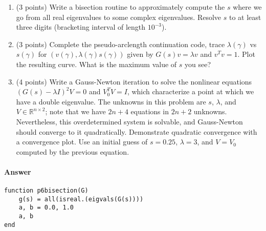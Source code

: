 \documentclass[12pt, leqno]{article} %
\providecommand{\tightlist}{%
  \setlength{\itemsep}{0pt}\setlength{\parskip}{0pt}}
\begin{document}
\begin{enumerate}
\def\labelenumi{\arabic{enumi}.}
\tightlist
\item
  (3 points) Write a bisection routine to approximately compute the
  \(s\) where we go from all real eigenvalues to some complex
  eigenvalues. Resolve \(s\) to at least three digits (bracketing
  interval of length \(10^{-3}\)).
\item
  (3 points) Complete the pseudo-arclength continuation code, trace
  \(\lambda(\gamma)\) vs \(s(\gamma)\) for
  \((v(\gamma), \lambda(\gamma) s(\gamma))\) given by
  \(G(s) v = \lambda v\) and \(v^T v = 1\). Plot the resulting curve.
  What is the maximum value of \(s\) you see?
\item
  (4 points) Write a Gauss-Newton iteration to solve the nonlinear
  equations \((G(s)-\lambda I)^2 V = 0\) and \(V_0^T V = I\), which
  characterize a point at which we have a double eigenvalue. The
  unknowns in this problem are \(s\), \(\lambda\), and
  \(V \in \mathbb{R}^{n \times 2}\); note that we have \(2n+4\)
  equations in \(2n+2\) unknowns. Nevertheless, this overdetermined
  system is solvable, and Gauss-Newton should converge to it
  quadratically. Demonstrate quadratic convergence with a convergence
  plot. Use an initial guess of \(s = 0.25\), \(\lambda = 3\), and
  \(V = V_0\) computed by the previous equation.
\end{enumerate}

\paragraph{Answer}


\begin{verbatim}
function p6bisection(G)
    g(s) = all(isreal.(eigvals(G(s))))
    a, b = 0.0, 1.0
    a, b
end
\end{verbatim}
\end{document}
